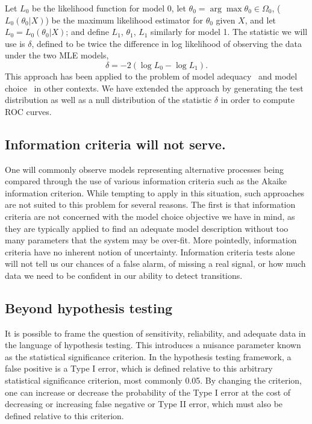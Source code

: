 \documentclass[authoryear,review,11pt]{elsarticle}
\begin{document}
Let $L_0$ be the likelihood function for model 0, 
let $\theta_0 = \arg \max \theta_0 \in \Omega_0$, ($L_0 (\theta_0 |X)$) 
be the maximum likelihood estimator for $\theta_0$ given $X$, and let $L_0 = L_0 (\theta_0 |X)$; 
and define $L_1$, $\theta_1$, $L_1$ similarly for model 1. 
The statistic we will use is $\delta$, 
defined to be twice the difference in log likelihood of observing the data under the two MLE models,
\begin{equation}\label{delta}
\delta = -2 (\log L_0 - \log L_1 ).
\end{equation}
This approach has been applied to the problem of model adequacy~\citep{Goldman1993} 
and model choice~\citep{Huelsenbeck1996} in other contexts.  
We have extended the approach by generating the test distribution 
as well as a null distribution of the statistic $\delta$ in order to compute ROC curves.  


%

\subsection*{Information criteria will not serve.}
One will commonly observe models representing alternative processes being compared through 
the use of various information criteria such as the Akaike information criterion.  
While tempting to apply in this situation, such approaches are not suited to this problem for several reasons.  
The first is that information criteria are not concerned with the model choice objective we have in mind,
as they are typically applied to find an adequate model description without too many parameters that the system may be over-fit.  
More pointedly, information criteria have no inherent notion of uncertainty.
Information criteria tests alone will not tell us our chances of a false alarm, of missing a real signal, 
or how much data we need to be confident in our ability to detect transitions.   

\subsection*{Beyond hypothesis testing}
It is possible to frame the question of sensitivity, reliability, and adequate data in the language of hypothesis testing. 
This introduces a nuisance parameter known as the statistical significance criterion.  
In the hypothesis testing framework, a false positive is a Type I error, 
which is defined relative to this arbitrary statistical significance criterion, most commonly 0.05.  
By changing the criterion, one can increase or decrease the probability of the Type I error 
at the cost of decreasing or increasing false negative or Type II error, which must also be defined relative to this criterion.  
\end{document}
